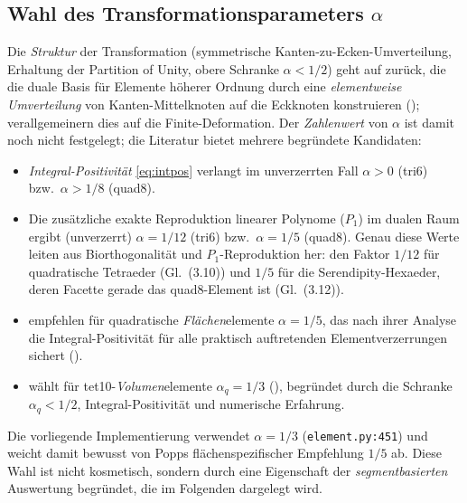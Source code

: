 \documentclass[a4paper,11pt]{article}
\def\tfrac#1#2{#1/#2}%
\newcommand{\file}[1]{\texttt{\small #1}}
\begin{document}
\subsection{Wahl des Transformationsparameters $\alpha$}
\label{sec:alphachoice}
Die \emph{Struktur} der Transformation (symmetrische Kanten-zu-Ecken-Umverteilung, Erhaltung der
Partition of Unity, obere Schranke $\alpha<\tfrac12$) geht auf \citet{lamichhane2005}
zurück, die die duale Basis für Elemente höherer Ordnung durch eine
\emph{elementweise Umverteilung} von Kanten-Mittelknoten auf die Eckknoten konstruieren
(\citealp[Gl.~(3.10)/(3.12)]{lamichhane2005}); \citet{popp2012} verallgemeinern dies auf die
Finite-Deformation. Der \emph{Zahlenwert} von $\alpha$ ist damit noch nicht festgelegt; die Literatur
bietet mehrere begründete Kandidaten:
\begin{itemize}\itemsep2pt
  \item \emph{Integral-Positivität} \eqref{eq:intpos} verlangt im unverzerrten Fall $\alpha>0$
        (tri6) bzw.\ $\alpha>\tfrac18$ (quad8).
  \item Die zusätzliche exakte Reproduktion linearer Polynome ($P_1$) im dualen Raum ergibt
        (unverzerrt) $\alpha=\tfrac{1}{12}$ (tri6) bzw.\ $\alpha=\tfrac15$ (quad8). Genau diese Werte
        leiten \citet{lamichhane2005} aus Biorthogonalität und $P_1$-Reproduktion her: den Faktor
        $\tfrac{1}{12}$ für quadratische Tetraeder (Gl.~(3.10)) und $\tfrac15$ für die
        Serendipity-Hexaeder, deren Facette gerade das quad8-Element ist (Gl.~(3.12)).
  \item \citet{popp2012} empfehlen für quadratische \emph{Flächen}elemente
        $\alpha=\tfrac15$, das nach ihrer Analyse die Integral-Positivität für alle praktisch
        auftretenden Elementverzerrungen sichert (\citealp[S.~B431]{popp2012}).
  \item \citet{farah} wählt für tet10-\emph{Volumen}elemente $\alpha_q=\tfrac13$
        (\citealp[Gl.~(6.20), S.~164]{farah}), begründet durch die Schranke $\alpha_q<\tfrac12$,
        Integral-Positivität und numerische Erfahrung.
\end{itemize}
Die vorliegende Implementierung verwendet $\alpha=\tfrac13$ (\file{element.py:\allowbreak{}451}) und weicht damit
bewusst von Popps flächenspezifischer Empfehlung $\tfrac15$ ab. Diese Wahl ist nicht kosmetisch,
sondern durch eine Eigenschaft der \emph{segmentbasierten} Auswertung begründet, die im Folgenden
dargelegt wird.
\end{document}

